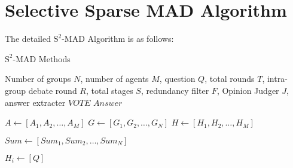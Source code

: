 \appendix
\section{Selective Sparse MAD Algorithm} \label{appendix:s^2-al}
The detailed \({\text{S}^2\text{-MAD}}\) Algorithm is as follows:
\begin{breakablealgorithm}
    \caption{\({\text{S}^2\text{-MAD}}\) Methods}
    \label{alg:S^2_MAD}
    \begin{algorithmic}[1]
        \Require Number of groups $N$, number of agents $M$, question $Q$, total rounds $T$, intra-group debate round $R$, total stages $S$, redundancy filter $F$, Opinion Judger $J$, answer extracter $VOTE$ 
        \Ensure $Answer$
     
        \State $A \gets [A_1,A_2,\ldots,A_M]$ 
        \Statex{}
        \State $G \gets [G_1,G_2,\ldots,G_N]$  
        \Statex{} 
        \State $H \gets [H_1,H_2,\ldots,H_M]$  
        \Statex{}
        
        \State $Sum \gets [Sum_1, Sum_2,\ldots,Sum_N]$  

            \State $H_i \gets [Q]$ %
        \EndFor
        

\end{algorithmic}
\end{breakablealgorithm}
